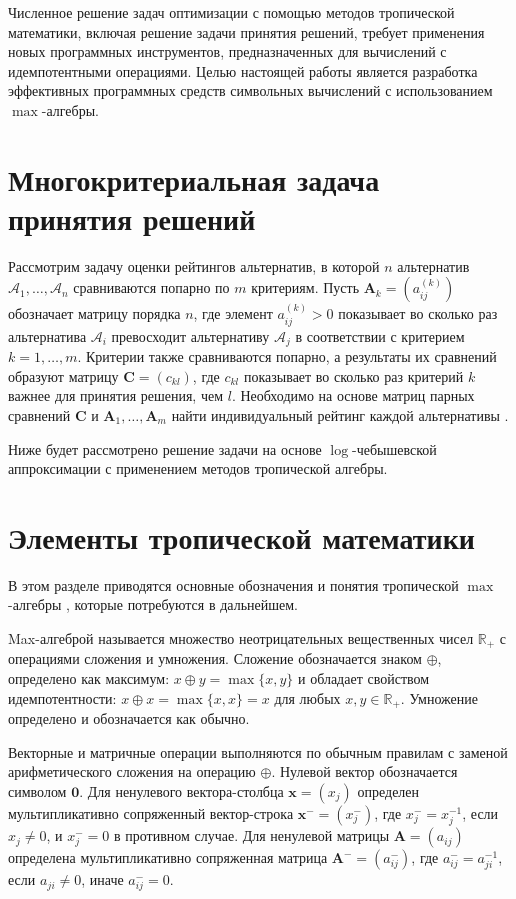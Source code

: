 \documentclass{spisok-article}
\begin{document}
Численное решение задач оптимизации с помощью методов тропической математики, включая решение задачи принятия решений, требует применения новых программных инструментов, предназначенных для вычислений с идемпотентными операциями. Целью настоящей работы является разработка эффективных программных средств символьных вычислений с использованием $\max$-алгебры.

\section{Многокритериальная задача принятия решений}
Рассмотрим задачу оценки рейтингов альтернатив, в которой $n$ альтернатив $\mathcal{A}_{1},\ldots,\mathcal{A}_{n}$ сравниваются попарно по $m$ критериям. Пусть $\bm{A}_{k} = (a_{ij}^{(k)})$ обозначает матрицу порядка $n$, где элемент $a_{ij}^{(k)}>0$ показывает во сколько раз альтернатива $\mathcal{A}_{i}$ превосходит альтернативу $\mathcal{A}_{j}$ в соответствии с критерием $k=1,\ldots,m$. Критерии также сравниваются попарно, а результаты их сравнений образуют матрицу $\bm{C}=(c_{kl})$, где $c_{kl}$ показывает во сколько раз критерий $k$ важнее для принятия решения, чем $l$. Необходимо на основе матриц парных сравнений $\bm{C}$ и $\bm{A}_{1},\ldots,\bm{A}_{m}$ найти индивидуальный рейтинг каждой альтернативы \cite{Saaty1993Prinyatie}.
    
Ниже будет рассмотрено решение задачи на основе $\log$-чебышевской аппроксимации с применением методов тропической алгебры.

\section{Элементы тропической математики}

В этом разделе приводятся основные обозначения и понятия тропической $\max$-алгебры \cite{Maslov1994Idemotent, Butkovic2010Maxlinear, Heidergott2006Max}, которые потребуются в дальнейшем.
    
Max-алгеброй называется множество неотрицательных вещественных чисел $\mathbb{R}_{+}$ с операциями сложения и умножения. Сложение обозначается знаком $\oplus$, определено как максимум: $x\oplus y=\max\{x,y\}$ и обладает свойством идемпотентности: ${x\oplus x=\max\{x,x\}=x}$ для любых $x,y\in\mathbb{R}_{+}$. Умножение определено и обозначается как обычно.  
        
Векторные и матричные операции выполняются по обычным правилам с заменой арифметического сложения на операцию $\oplus$. Нулевой вектор обозначается символом $\bm{0}$. Для ненулевого вектора-столбца $\bm{x}=(x_{j})$ определен мультипликативно сопряженный вектор-строка $\bm{x}^{-}=(x_{j}^{-})$, где $x_{j}^{-}=x_{j}^{-1}$, если $x_{j}\ne0$, и $x_{j}^{-}=0$ в противном случае. Для ненулевой матрицы $\bm{A}=(a_{ij})$ определена мультипликативно сопряженная матрица $\bm{A}^{-}=(a_{ij}^{-})$, где $a_{ij}^{-}=a_{ji}^{-1}$, если $a_{ji}\ne0$, иначе $a_{ij}^{-}=0$.
\end{document}

